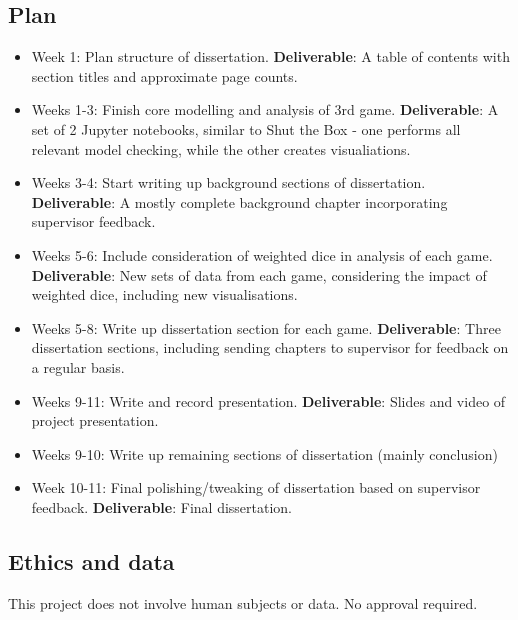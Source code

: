 \documentclass[11pt]{article}
\begin{document}
\subsection{Plan}\label{plan}

\begin{itemize}
    \item Week 1: Plan structure of dissertation. \textbf{Deliverable}: A table of contents with section titles and approximate page counts.
    \item Weeks 1-3: Finish core modelling and analysis of 3rd game. \textbf{Deliverable}: A set of 2 Jupyter notebooks, similar to Shut the Box - one performs all relevant model checking, while the other creates visualiations.
    \item Weeks 3-4: Start writing up background sections of dissertation. \textbf{Deliverable}: A mostly complete background chapter incorporating supervisor feedback.
    \item Weeks 5-6: Include consideration of weighted dice in analysis of each game. \textbf{Deliverable}: New sets of data from each game, considering the impact of weighted dice, including new visualisations.
    \item Weeks 5-8: Write up dissertation section for each game. \textbf{Deliverable}: Three dissertation sections, including sending chapters to supervisor for feedback on a regular basis.
    \item Weeks 9-11: Write and record presentation. \textbf{Deliverable}: Slides and video of project presentation.
    \item Weeks 9-10: Write up remaining sections of dissertation (mainly conclusion)
    \item Week 10-11: Final polishing/tweaking of dissertation based on supervisor feedback. \textbf{Deliverable}: Final dissertation.
\end{itemize}

    
\subsection{Ethics and data}\label{ethics}
This project does not involve human subjects or data. No approval required.
\end{document}
